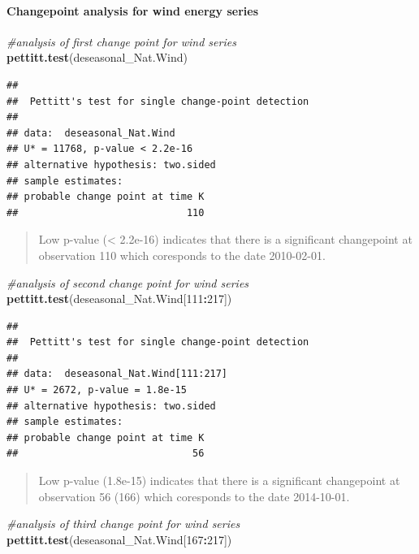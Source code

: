 \documentclass[12pt,]{article}
\newenvironment{Shaded}{\begin{snugshade}}{\end{snugshade}}
\newcommand{\KeywordTok}[1]{\textcolor[rgb]{0.13,0.29,0.53}{\textbf{#1}}}
\newcommand{\DecValTok}[1]{\textcolor[rgb]{0.00,0.00,0.81}{#1}}
\newcommand{\CommentTok}[1]{\textcolor[rgb]{0.56,0.35,0.01}{\textit{#1}}}
\newcommand{\OperatorTok}[1]{\textcolor[rgb]{0.81,0.36,0.00}{\textbf{#1}}}
\newcommand{\NormalTok}[1]{#1}
\let\oldparagraph\paragraph
\renewcommand{\paragraph}[1]{\oldparagraph{#1}\mbox{}}
\begin{document}
\paragraph{Changepoint analysis for wind energy
series}\label{changepoint-analysis-for-wind-energy-series}

\begin{Shaded}
\begin{Highlighting}[]
\CommentTok{#analysis of first change point for wind series}
\KeywordTok{pettitt.test}\NormalTok{(deseasonal_Nat.Wind)}
\end{Highlighting}
\end{Shaded}

\begin{verbatim}
## 
##  Pettitt's test for single change-point detection
## 
## data:  deseasonal_Nat.Wind
## U* = 11768, p-value < 2.2e-16
## alternative hypothesis: two.sided
## sample estimates:
## probable change point at time K 
##                             110
\end{verbatim}

\begin{quote}
Low p-value (\textless{} 2.2e-16) indicates that there is a significant
changepoint at observation 110 which coresponds to the date 2010-02-01.
\end{quote}

\begin{Shaded}
\begin{Highlighting}[]
\CommentTok{#analysis of second change point for wind series}
\KeywordTok{pettitt.test}\NormalTok{(deseasonal_Nat.Wind[}\DecValTok{111}\OperatorTok{:}\DecValTok{217}\NormalTok{])}
\end{Highlighting}
\end{Shaded}

\begin{verbatim}
## 
##  Pettitt's test for single change-point detection
## 
## data:  deseasonal_Nat.Wind[111:217]
## U* = 2672, p-value = 1.8e-15
## alternative hypothesis: two.sided
## sample estimates:
## probable change point at time K 
##                              56
\end{verbatim}

\begin{quote}
Low p-value (1.8e-15) indicates that there is a significant changepoint
at observation 56 (166) which coresponds to the date 2014-10-01.
\end{quote}

\begin{Shaded}
\begin{Highlighting}[]
\CommentTok{#analysis of third change point for wind series}
\KeywordTok{pettitt.test}\NormalTok{(deseasonal_Nat.Wind[}\DecValTok{167}\OperatorTok{:}\DecValTok{217}\NormalTok{])}
\end{Highlighting}
\end{Shaded}
\end{document}
